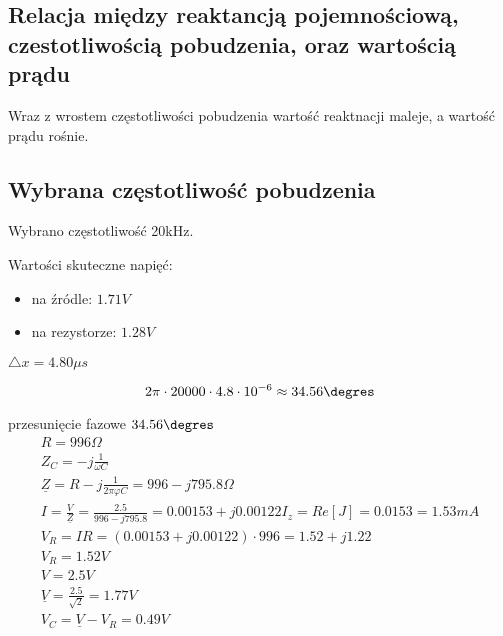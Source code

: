 \documentclass[polish,polish,a4paper]{article}
\begin{document}
	\begin{figure}[H]
	\centering
\end{figure}


\subsection{Relacja między reaktancją pojemnościową, czestotliwością pobudzenia, oraz wartością prądu}
Wraz z wrostem częstotliwości pobudzenia wartość reaktnacji maleje, a wartość prądu rośnie.
\subsection{Wybrana częstotliwość pobudzenia}
	Wybrano częstotliwość 20kHz.
	
	Wartości skuteczne napięć:
	\begin{itemize}
		\item na źródle: $ 1.71V  $
		\item na rezystorze: $1.28V$
	\end{itemize}

	$\triangle x = 4.80 \mu s$
	
	\begin{equation*}
	2\pi \cdot 20000 \cdot 4.8 \cdot 10^{-6} \approx 34.56\degres
	\end{equation*}
	
	przesunięcie fazowe $34.56\degres$
	\begin{gather*}
	R=996\Omega\\
	Z_{C} = -j\frac{1}{\omega C}\\
	\underline{Z}=R-j\frac{1}{2\pi \varphi C} = 996 - j795.8\Omega\\
	I = \frac{V}{\underline{Z}}= \frac{2.5}{996-j795.8}
	= 0.00153 + j0.00122
	I_{z}=Re[J]=0.0153=1.53mA\\
	V_{R}= IR = (0.00153 + j0.00122) \cdot 996 = 1.52 + j1.22\\
	V_{R} = 1.52V\\
	V=2.5V\\
	\underline{V} = \frac{2.5}{\sqrt{2}} = 1.77V\\
	V_{C} = \underline{V} - V_{R} = 0.49V
	\end{gather*}
	
\end{document}
